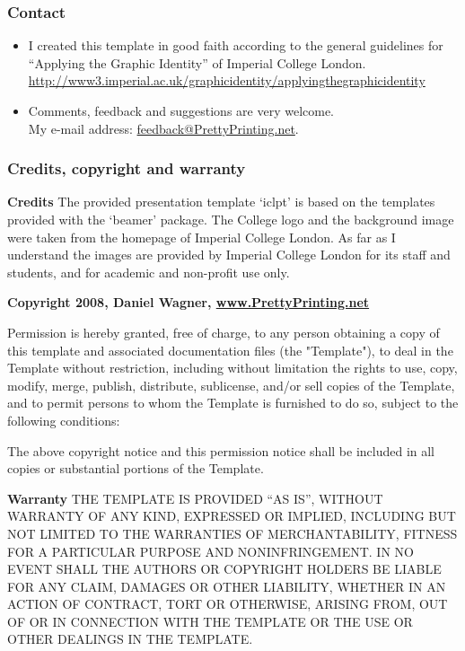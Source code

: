 \documentclass[t]{beamer}
\begin{document}
\begin{frame}
\frametitle{Contact}
	\begin{itemize}
	\item I created this template in good faith according
	to the general guidelines for ``Applying the Graphic
	Identity'' of Imperial College London.\\	
\url{
http://www3.imperial.ac.uk/graphicidentity/applyingthegraphicidentity}
	\item Comments, feedback and suggestions are very welcome.\\
	My e-mail address:
	\href{mailto:feedback@prettyprinting.net}{feedback@PrettyPrinting.net}.
	\end{itemize}
\end{frame} 

\begin{frame}
\frametitle{Credits, copyright and warranty}

\tiny

\textbf{Credits}
The provided presentation template `iclpt' is based on the 
templates provided with the `beamer' package. The College 
logo and the background image were taken from the homepage 
of Imperial College London. As far as I understand the images 
are provided by Imperial College London for its staff and students, 
and for academic and non-profit use only.
\medskip

\textbf{Copyright 2008, Daniel Wagner, \url{www.PrettyPrinting.net}}

Permission is hereby granted, free of charge, to any person
obtaining a copy of this template and associated
documentation files (the "Template"), to deal in the Template
without restriction, including without limitation the rights to
use, copy, modify, merge, publish, distribute, sublicense,
and/or sell copies of the Template, and to permit persons to
whom the Template is furnished to do so, subject to the
following conditions:\medskip

The above copyright notice and this permission notice shall be
included in all copies or substantial portions of the Template.

\textbf{Warranty}
\uppercase{The Template is provided ``As Is'', without warranty of any
kind, expressed or implied, including but not limited to the
warranties of merchantability, fitness for a particular purpose and
noninfringement. In no event shall the authors or copyright holders be
liable for any claim, damages or other liability, whether in an action
of contract, tort or otherwise, arising from, out of or in connection
with the template or the use or other dealings in the template.}
\end{frame} 
\end{document}
